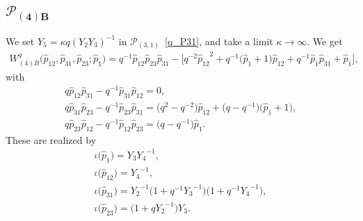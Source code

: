 \documentclass[10pt,a4paper]{amsart}
\numberwithin{equation}{section}
\begin{document}
\subsection[$\mathcal{P}_{(4)B}$]{$\boldsymbol{\mathcal{P}_{(4)B}}$}
We set $Y_5 = \kappa q (Y_2 Y_3)^{-1}$ in $\mathcal{P}_{(3,1)}$~\eqref{q_P31}, and take a limit $\kappa\to\infty$. We get
\begin{gather*}
 W^q_{(4)B}\big( \hat{p}_{12}, \hat{p}_{31}, \hat{p}_{23}; \hat{p}_1 \big) = q^{-1} \hat{p}_{12} \hat{p}_{23} \hat{p}_{31} - \big[ q^{-2} {\hat{p}_{12}}^{2} + q^{-1}\big( \hat{p}_1 +1\big) \hat{p}_{12}
 + q^{-1} \hat{p}_1 \hat{p}_{31} + \hat{p}_1\big],
\end{gather*}
with
\begin{gather*}
 q \hat{p}_{12} \hat{p}_{31} - q^{-1} \hat{p}_{31} \hat{p}_{12} = 0, \\
 q \hat{p}_{31} \hat{p}_{23} - q^{-1} \hat{p}_{23} \hat{p}_{31} = \big(q^2 - q^{-2}\big) \hat{p}_{12} + \big( q- q^{-1}\big)\big( \hat{p}_1 + 1\big) , \\
 q \hat{p}_{23} \hat{p}_{12} - q^{-1} \hat{p}_{12} \hat{p}_{23} = \big( q - q^{-1}\big) \hat{p}_1 .
\end{gather*}
These are realized by
\begin{gather*}
 \iota\big(\hat{p}_1\big) = Y_3 {Y_4}^{-1} , \\
\iota\big(\hat{p}_{12}\big) = {Y_4}^{-1} , \\
 \iota\big(\hat{p}_{31}\big) = {Y_2}^{-1}\big( 1 + q^{-1} {Y_3}^{-1}\big)\big( 1 + q^{-1} {Y_4}^{-1}\big) , \\
\iota\big(\hat{p}_{23}\big) = \big( 1 + q {Y_2}^{-1}\big) {Y_3} .
\end{gather*}
\end{document}
